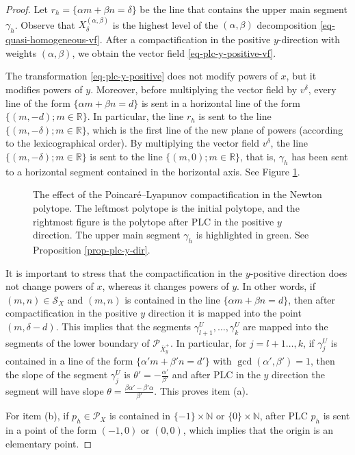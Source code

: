 \documentclass[12pt]{amsart}
\begin{document}
\begin{proof}
 Let $r_{h} = \{\alpha m + \beta n = \delta\}$ be the line that contains the upper main segment $\gamma_{h}$. Observe that $X^{(\alpha,\beta)}_{\delta}$ is the highest level of the $(\alpha,\beta)$ decomposition \eqref{eq-quasi-homogeneous-vf}. After a compactification in the positive $y$-direction with weights $(\alpha,\beta)$, we obtain the vector field \eqref{eq-plc-y-positive-vf}.

The transformation \eqref{eq-plc-y-positive} does not modify powers of $x$, but it modifies powers of $y$. Moreover, before multiplying the vector field by $v^{\delta}$, every line of the form $\{\alpha m + \beta n = d\}$ is sent in a horizontal line of the form $\{(m,-d); m\in\mathbb{R}\}$. In particular, the line $r_{h}$ is sent to the line $\{(m,-\delta); m\in\mathbb{R}\}$, which is the first line of the new plane of powers (according to the lexicographical order). By multiplying the vector field $v^{\delta}$, the line $\{(m,-\delta); m\in\mathbb{R}\}$ is sent to the line $\{(m,0); m\in\mathbb{R}\}$, that is, $\gamma_{h}$ has been sent to a horizontal segment contained in the horizontal axis. See Figure \ref{fig-plc-y-dir}.

\begin{figure}[h]
\caption{\footnotesize{The effect of the Poincaré--Lyapunov compactification in the Newton polytope. The leftmost polytope is the initial polytope, and the rightmost figure is the polytope after PLC in the positive $y$ direction. The upper main segment $\gamma_{h}$ is highlighted in green. See Proposition \ref{prop-plc-y-dir}.}}
\label{fig-plc-y-dir}
\end{figure}

It is important to stress that the compactification in the $y$-positive direction does not change powers of $x$, whereas it changes powers of $y$. In other words, if $(m,n)\in\mathcal{S}_{X}$ and $(m,n)$ is contained in the line $\{\alpha m + \beta n = d\}$, then after compactification in the positive $y$ direction it is mapped into the point $(m,\delta - d)$. This implies that the segments $\gamma^{U}_{l+1},\dots,\gamma^{U}_{k}$ are mapped into the segments of the lower boundary of $\mathcal{P}_{\overline{X}^{+}_{y}}$. In particular, for $j = l+1\dots,k$, if $\gamma^{U}_{j}$ is contained in a line of the form $\{\alpha' m + \beta'n = d'\}$ with $\gcd(\alpha',\beta') = 1$, then the slope of the segment $\gamma^{U}_{j}$ is $\theta' = -\frac{\alpha'}{\beta'}$ and after PLC in the $y$ direction the segment will have slope $\theta = \frac{\beta\alpha' - \beta'\alpha}{\beta'}$. This proves item (a).

For item (b), if $p_{h}\in\mathcal{P}_{X}$ is contained in $\{-1\}\times\mathbb{N}$ or $\{0\}\times\mathbb{N}$, after PLC $p_{h}$ is sent in a point of the form $(-1,0)$ or $(0,0)$, which implies that the origin is an elementary point. 
 \end{proof}
\end{document}
